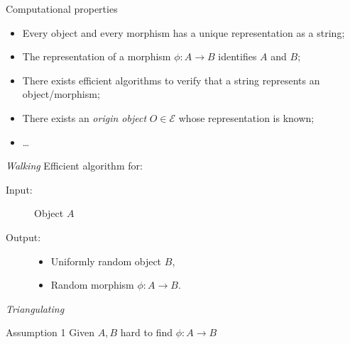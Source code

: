 \documentclass[aspectratio=169]{beamer}
\newcommand{\E}{\mathcal{E}}
\begin{document}

\begin{frame}{Computational properties}
  \large
  \begin{itemize}
    \setlength{\itemsep}{2em}
  \item Every object and every morphism has a unique representation as
    a string;
  \item The representation of a morphism $\phi:A\to B$ identifies $A$
    and $B$;
  \item There exists efficient algorithms to verify that a string
    represents an object/morphism;
  \item There exists an \emph{origin object} $O \in \E$ whose
    representation is known;
  \item \dots
  \end{itemize}
\end{frame}


\begin{frame}{\textit{Walking}}
  \large
  Efficient algorithm for:
  
  \bigskip
  \begin{description}
  \item[Input:] Object $A$
  \item[Output:]
    \begin{itemize}
    \item Uniformly random object $B$,
    \item Random morphism $\phi:A\to B$.
    \end{itemize}
  \end{description}
\end{frame}


\begin{frame}{\textit{Triangulating}}
  \centering
\end{frame}


\begin{frame}{Assumption 1}
  Given $A, B$ hard to find $\phi: A \to B$

  \vfill
  
  \centering
\end{frame}
\end{document}
